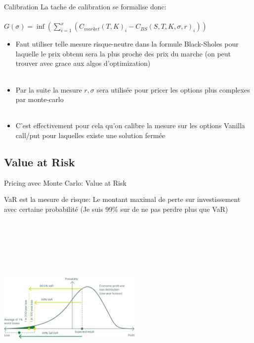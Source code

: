 \documentclass[10pt]{beamer}
\begin{document}
\begin{frame}{Calibration}{}
  La tache de calibration se formalise donc: \\~\\
  $G(\sigma) = \inf(\sum \limits_{i=1}^{x} (C_{market}(T,K)_i - C_{BS}(S,T,K,\sigma , r)_i))$ 
  
  \begin{itemize}
  \item Faut utiliser telle mesure risque-neutre dans la formule Black-Sholes pour laquelle le prix obtenu sera la plus proche des prix du marche (on peut trouver avec grace aux algos d'optimization) \\~\\
  
  \item Par la suite la mesure $r , \sigma $  sera utilisée pour pricer les options plus complexes par monte-carlo \\~\\
  
  \item C'est effectivement pour cela qu'on calibre la mesure sur les options Vanilla call/put pour laquelles existe une solution fermée
  
  \end{itemize}
  

\end{frame}


\subsection{Value at Risk}

\begin{frame}{Pricing avec Monte Carlo: Value at Risk}{}
  
VaR est la mesure de risque: Le montant maximal de perte sur investissement avec certaine probabilité (Je suis 99\% sur de ne pas perdre plus que VaR) \\~\\

\includegraphics[width=7cm,height=9cm,keepaspectratio]{AAUgraphics/var.png}


\end{frame}
\end{document}
